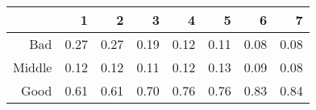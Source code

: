 \begin{table}[ht]
\centering
\begin{tabular}{rrrrrrrr}
  \hline
 & 1 & 2 & 3 & 4 & 5 & 6 & 7 \\ 
  \hline
Bad & 0.27 & 0.27 & 0.19 & 0.12 & 0.11 & 0.08 & 0.08 \\ 
  Middle & 0.12 & 0.12 & 0.11 & 0.12 & 0.13 & 0.09 & 0.08 \\ 
  Good & 0.61 & 0.61 & 0.70 & 0.76 & 0.76 & 0.83 & 0.84 \\ 
   \hline
\end{tabular}
\end{table}
